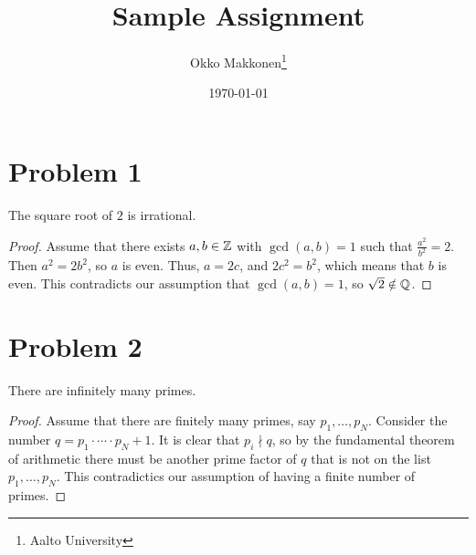\documentclass[a4paper, 12pt]{myassignment}
\title{Sample Assignment}
\author{Okko Makkonen\thanks{Aalto University}}
\date{\today}
\begin{document}
\maketitle
    
\section*{Problem 1}

\begin{claim}
The square root of $2$ is irrational.
\end{claim}

\begin{proof}
Assume that there exists $a, b \in \mathbb{Z}$ with $\gcd(a, b) = 1$ such that $\frac{a^2}{b^2} = 2$. Then $a^2 = 2b^2$, so $a$ is even. Thus, $a = 2c$, and $2c^2 = b^2$, which means that $b$ is even. This contradicts our assumption that $\gcd(a, b) = 1$, so $\sqrt{2} \notin \mathbb{Q}$.
\end{proof}

\section*{Problem 2}

\begin{claim}
There are infinitely many primes.
\end{claim}

\begin{proof}
Assume that there are finitely many primes, say $p_1, \dots, p_N$. Consider the number $q = p_1 \cdot \cdots \cdot p_N + 1$. It is clear that $p_i \nmid q$, so by the fundamental theorem of arithmetic there must be another prime factor of $q$ that is not on the list $p_1, \dots, p_N$. This contradictics our assumption of having a finite number of primes.
\end{proof}
\end{document}
